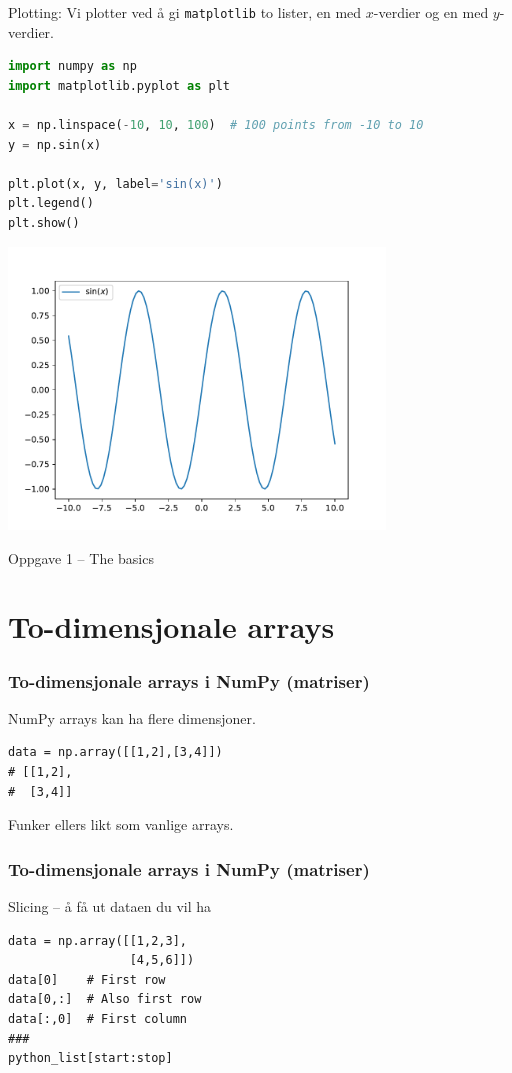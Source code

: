 \documentclass{beamer}
\begin{document}
\begin{frame}[fragile]
  Plotting:
  Vi plotter ved å gi \lstinline{matplotlib} to lister, en med $x$-verdier og en med $y$-verdier.
  \begin{lstlisting}[language=python, breaklines=true, frame=single]
import numpy as np
import matplotlib.pyplot as plt
    
x = np.linspace(-10, 10, 100)  # 100 points from -10 to 10
y = np.sin(x)

plt.plot(x, y, label='sin(x)')
plt.legend()
plt.show()
  \end{lstlisting}
\end{frame}
\begin{frame}
  \centering
  \includegraphics[width=0.75\textwidth]{simple_plot}
\end{frame}
\begin{frame}
  \begin{block}{Oppgave 1 -- The basics}\end{block}
\end{frame}


\section{To-dimensjonale arrays}

\begin{frame}[fragile]
  \frametitle{To-dimensjonale arrays i NumPy (matriser)}
  NumPy arrays kan ha flere dimensjoner.
  \begin{lstlisting}
data = np.array([[1,2],[3,4]])
# [[1,2],
#  [3,4]]
  \end{lstlisting}
  Funker ellers likt som vanlige arrays.\\
\end{frame}
\begin{frame}[fragile]
  \frametitle{To-dimensjonale arrays i NumPy (matriser)}
  Slicing -- å få ut dataen du vil ha
  \begin{lstlisting}
data = np.array([[1,2,3],
                 [4,5,6]])
data[0]    # First row
data[0,:]  # Also first row
data[:,0]  # First column
###
python_list[start:stop]
  \end{lstlisting}
\end{frame}
\end{document}
